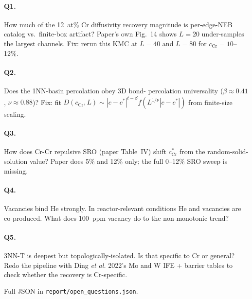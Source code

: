 \documentclass[11pt]{article}
\begin{document}
\paragraph{Q1.} How much of the 12~at\% Cr diffusivity recovery
magnitude is per-edge-NEB catalog vs.\ finite-box artifact?
Paper's own Fig.~14 shows $L=20$ under-samples the largest
channels.  Fix: rerun this KMC at $L = 40$ and $L = 80$ for
$c_\text{Cr} = 10$--12\%.

\paragraph{Q2.} Does the 1NN-basin percolation obey 3D bond-
percolation universality ($\beta \approx 0.41$, $\nu \approx 0.88$)?
Fix: fit $D(c_\text{Cr}, L) \sim |c-c^*|^{t-\beta}
f(L^{1/\nu}|c-c^*|)$ from finite-size scaling.

\paragraph{Q3.} How does Cr-Cr repulsive SRO (paper Table~IV) shift
$c_\text{Cr}^*$ from the random-solid-solution value?  Paper does 5\%
and 12\% only; the full 0--12\% SRO sweep is missing.

\paragraph{Q4.} Vacancies bind He strongly.  In reactor-relevant
conditions He and vacancies are co-produced.  What does 100~ppm
vacancy do to the non-monotonic trend?

\paragraph{Q5.} 3NN-T is deepest but topologically-isolated.
Is that specific to Cr or general?  Redo the pipeline with Ding
\emph{et al.} 2022's Mo and W IFE + barrier tables to check whether
the recovery is Cr-specific.

Full JSON in \texttt{report/open\_questions.json}.
\end{document}
